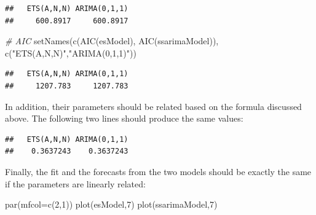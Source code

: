 \documentclass[
]{book}
\newenvironment{Shaded}{\begin{snugshade}}{\end{snugshade}}
\newcommand{\AttributeTok}[1]{\textcolor[rgb]{0.77,0.63,0.00}{#1}}
\newcommand{\CommentTok}[1]{\textcolor[rgb]{0.56,0.35,0.01}{\textit{#1}}}
\newcommand{\DecValTok}[1]{\textcolor[rgb]{0.00,0.00,0.81}{#1}}
\newcommand{\FunctionTok}[1]{\textcolor[rgb]{0.00,0.00,0.00}{#1}}
\newcommand{\NormalTok}[1]{#1}
\newcommand{\SpecialCharTok}[1]{\textcolor[rgb]{0.00,0.00,0.00}{#1}}
\newcommand{\StringTok}[1]{\textcolor[rgb]{0.31,0.60,0.02}{#1}}
\theoremstyle{definition}
\theoremstyle{definition}
\theoremstyle{definition}
\theoremstyle{definition}
\theoremstyle{remark}
\begin{document}
\begin{verbatim}
##   ETS(A,N,N) ARIMA(0,1,1) 
##     600.8917     600.8917
\end{verbatim}

\begin{Shaded}
\begin{Highlighting}[]
\CommentTok{\# AIC}
\FunctionTok{setNames}\NormalTok{(}\FunctionTok{c}\NormalTok{(}\FunctionTok{AIC}\NormalTok{(esModel), }\FunctionTok{AIC}\NormalTok{(ssarimaModel)),}
         \FunctionTok{c}\NormalTok{(}\StringTok{"ETS(A,N,N)"}\NormalTok{,}\StringTok{"ARIMA(0,1,1)"}\NormalTok{))}
\end{Highlighting}
\end{Shaded}

\begin{verbatim}
##   ETS(A,N,N) ARIMA(0,1,1) 
##     1207.783     1207.783
\end{verbatim}

In addition, their parameters should be related based on the formula discussed above. The following two lines should produce the same values:

\begin{Shaded}
\end{Shaded}

\begin{verbatim}
##   ETS(A,N,N) ARIMA(0,1,1) 
##    0.3637243    0.3637243
\end{verbatim}

Finally, the fit and the forecasts from the two models should be exactly the same if the parameters are linearly related:

\begin{Shaded}
\begin{Highlighting}[]
\FunctionTok{par}\NormalTok{(}\AttributeTok{mfcol=}\FunctionTok{c}\NormalTok{(}\DecValTok{2}\NormalTok{,}\DecValTok{1}\NormalTok{))}
\FunctionTok{plot}\NormalTok{(esModel,}\DecValTok{7}\NormalTok{)}
\FunctionTok{plot}\NormalTok{(ssarimaModel,}\DecValTok{7}\NormalTok{)}
\end{Highlighting}
\end{Shaded}
\end{document}
